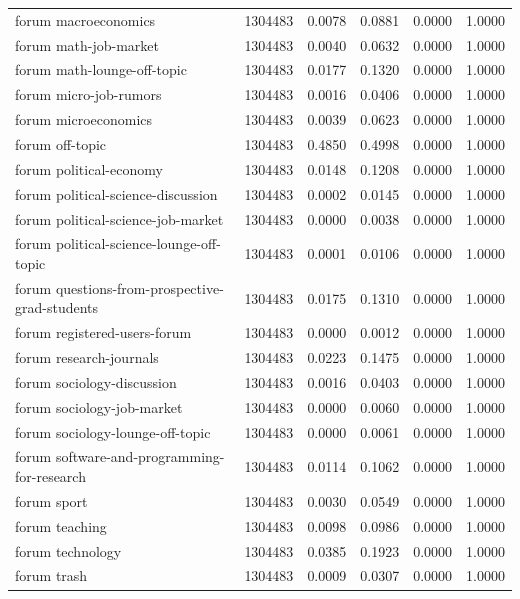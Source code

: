 \documentclass[11pt]{article}
\begin{document}
\begin{center}
\begin{longtable}{lrrrrr}
forum macroeconomics & 1304483 & 0.0078 & 0.0881 & 0.0000 & 1.0000 \\
forum math-job-market & 1304483 & 0.0040 & 0.0632 & 0.0000 & 1.0000 \\
forum math-lounge-off-topic & 1304483 & 0.0177 & 0.1320 & 0.0000 & 1.0000 \\
forum micro-job-rumors & 1304483 & 0.0016 & 0.0406 & 0.0000 & 1.0000 \\
forum microeconomics & 1304483 & 0.0039 & 0.0623 & 0.0000 & 1.0000 \\
forum off-topic & 1304483 & 0.4850 & 0.4998 & 0.0000 & 1.0000 \\
forum political-economy & 1304483 & 0.0148 & 0.1208 & 0.0000 & 1.0000 \\
forum political-science-discussion & 1304483 & 0.0002 & 0.0145 & 0.0000 & 1.0000 \\
forum political-science-job-market & 1304483 & 0.0000 & 0.0038 & 0.0000 & 1.0000 \\
forum political-science-lounge-off-topic & 1304483 & 0.0001 & 0.0106 & 0.0000 & 1.0000 \\
forum questions-from-prospective-grad-students & 1304483 & 0.0175 & 0.1310 & 0.0000 & 1.0000 \\
forum registered-users-forum & 1304483 & 0.0000 & 0.0012 & 0.0000 & 1.0000 \\
forum research-journals & 1304483 & 0.0223 & 0.1475 & 0.0000 & 1.0000 \\
forum sociology-discussion & 1304483 & 0.0016 & 0.0403 & 0.0000 & 1.0000 \\
forum sociology-job-market & 1304483 & 0.0000 & 0.0060 & 0.0000 & 1.0000 \\
forum sociology-lounge-off-topic & 1304483 & 0.0000 & 0.0061 & 0.0000 & 1.0000 \\
forum software-and-programming-for-research & 1304483 & 0.0114 & 0.1062 & 0.0000 & 1.0000 \\
forum sport & 1304483 & 0.0030 & 0.0549 & 0.0000 & 1.0000 \\
forum teaching & 1304483 & 0.0098 & 0.0986 & 0.0000 & 1.0000 \\
forum technology & 1304483 & 0.0385 & 0.1923 & 0.0000 & 1.0000 \\
forum trash & 1304483 & 0.0009 & 0.0307 & 0.0000 & 1.0000 \\
\end{longtable}
\end{center}
\captionsetup{justification=centering,singlelinecheck=true}
\end{document}
